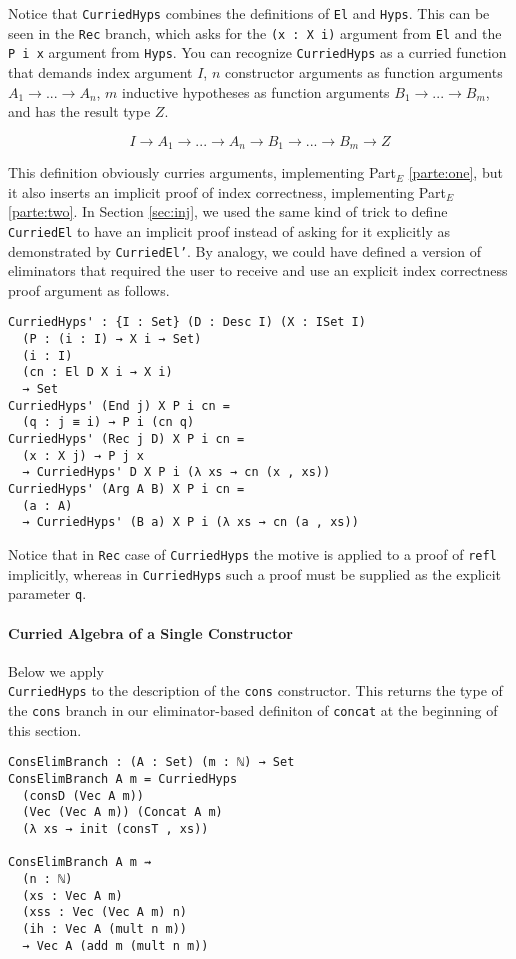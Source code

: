 \documentclass[nonatbib]{sigplanconf}
\newcommand{\refsec}[1]{Section \ref{sec:#1}}
\newcommand{\refparte}[1]{Part$_E$ \ref{parte:#1}}
\begin{document}
Notice that {\tt CurriedHyps} combines the
definitions of {\tt El} and {\tt Hyps}. This can be seen in the
{\tt Rec} branch, which asks for the {\tt (x : X i)} argument
from {\tt El} and the {\tt P i x} argument from {\tt Hyps}. You can
recognize {\tt CurriedHyps} as a curried function that demands
index argument $I$, $n$ constructor arguments as function arguments
$A_1 → ... → A_n$, $m$ inductive hypotheses as function arguments
$B_1 → ... → B_m$, and has the result type $Z$.

\[
I → A_1 → ... → A_n → B_1 → ... → B_m → Z
\]

This definition obviously curries arguments, implementing
\refparte{one}, but it also inserts an implicit proof of index
correctness, implementing \refparte{two}. In \refsec{inj}, we used
the same kind of trick to define {\tt CurriedEl} to have an implicit
proof instead of asking for it explicitly as demonstrated
by {\tt CurriedEl'}. By analogy, we could have defined a version of
eliminators that required the user to receive and use an explicit
index correctness proof argument as follows.

\begin{verbatim}
CurriedHyps' : {I : Set} (D : Desc I) (X : ISet I)
  (P : (i : I) → X i → Set)
  (i : I)
  (cn : El D X i → X i)
  → Set
CurriedHyps' (End j) X P i cn =
  (q : j ≡ i) → P i (cn q)
CurriedHyps' (Rec j D) X P i cn =
  (x : X j) → P j x
  → CurriedHyps' D X P i (λ xs → cn (x , xs))
CurriedHyps' (Arg A B) X P i cn =
  (a : A)
  → CurriedHyps' (B a) X P i (λ xs → cn (a , xs))
\end{verbatim}

Notice that in
{\tt Rec} case of {\tt CurriedHyps} the motive is applied to a proof
of {\tt refl} implicitly, whereas in {\tt CurriedHyps} such a proof
must be supplied as the explicit parameter {\tt q}.

\paragraph{Curried Algebra of a Single Constructor}

Below we apply \\
{\tt CurriedHyps} to the description of the
{\tt cons} constructor. This returns the type of the {\tt cons} branch
in our eliminator-based definiton of {\tt concat} at the
beginning of this section.

\begin{verbatim}
ConsElimBranch : (A : Set) (m : ℕ) → Set
ConsElimBranch A m = CurriedHyps
  (consD (Vec A m))
  (Vec (Vec A m)) (Concat A m)
  (λ xs → init (consT , xs))

ConsElimBranch A m ⇝
  (n : ℕ)
  (xs : Vec A m)
  (xss : Vec (Vec A m) n)
  (ih : Vec A (mult n m))
  → Vec A (add m (mult n m))
\end{verbatim}
\end{document}
